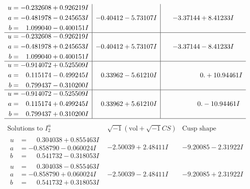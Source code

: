 \documentclass[1p]{elsarticle_modified}
\theoremstyle{definition}
\newcommand{\I}{\sqrt{-1}}
\begin{document}
$$\begin{array}{c|c|c}
\begin{aligned}
u &= -0.232608 + 0.926219 I \\
a &= -0.481978 - 0.245653 I \\
b &= \phantom{-}1.099040 - 0.400151 I\end{aligned}
 & -0.40412 - 5.73107 I & -3.37144 + 8.41233 I \\ \hline\begin{aligned}
u &= -0.232608 - 0.926219 I \\
a &= -0.481978 + 0.245653 I \\
b &= \phantom{-}1.099040 + 0.400151 I\end{aligned}
 & -0.40412 + 5.73107 I & -3.37144 - 8.41233 I \\ \hline\begin{aligned}
u &= -0.914072 + 0.525509 I \\
a &= \phantom{-}0.115174 - 0.499245 I \\
b &= \phantom{-}0.799437 - 0.310200 I\end{aligned}
 & \phantom{-}0.33962 - 5.61210 I & \phantom{-0.000000 -}0. + 10.94461 I \\ \hline\begin{aligned}
u &= -0.914072 - 0.525509 I \\
a &= \phantom{-}0.115174 + 0.499245 I \\
b &= \phantom{-}0.799437 + 0.310200 I\end{aligned}
 & \phantom{-}0.33962 + 5.61210 I & \phantom{-0.000000 } 0. - 10.94461 I\\
 \hline 
 \end{array}$$\newpage$$\begin{array}{c|c|c}  
\text{Solutions to }I^u_{2}& \I (\text{vol} + \sqrt{-1}CS) & \text{Cusp shape}\\
 \hline 
\begin{aligned}
u &= \phantom{-}0.304038 + 0.855463 I \\
a &= -0.858790 - 0.060024 I \\
b &= \phantom{-}0.541732 - 0.318053 I\end{aligned}
 & -2.50039 + 2.48411 I & -9.20085 - 2.31922 I \\ \hline\begin{aligned}
u &= \phantom{-}0.304038 - 0.855463 I \\
a &= -0.858790 + 0.060024 I \\
b &= \phantom{-}0.541732 + 0.318053 I\end{aligned}
 & -2.50039 - 2.48411 I & -9.20085 + 2.31922 I \\ \hline\begin{aligned}

\end{aligned}
\end{array}$$
\end{document}
